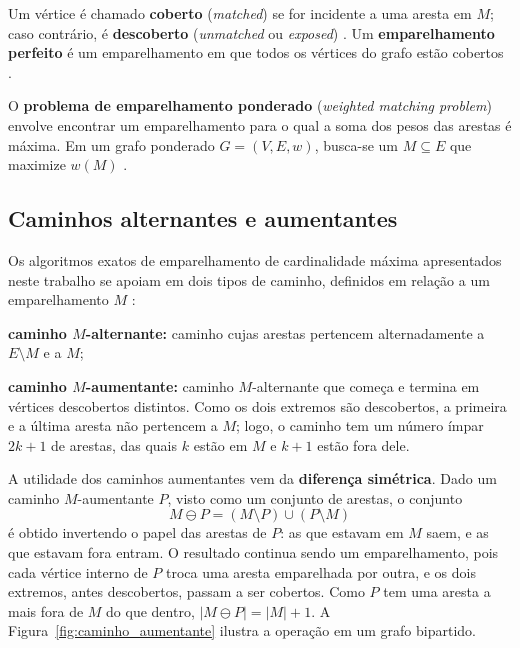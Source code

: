 Um vértice é chamado \textbf{coberto} (\textit{matched}) se for incidente a uma aresta em $M$; caso contrário, é \textbf{descoberto} (\textit{unmatched} ou \textit{exposed}) \cite{cormen}. Um \textbf{emparelhamento perfeito} é um emparelhamento em que todos os vértices do grafo estão cobertos \cite{kleinberg}.

O \textbf{problema de emparelhamento ponderado} (\textit{weighted matching problem}) envolve encontrar um emparelhamento para o qual a soma dos pesos das arestas é máxima. Em um grafo ponderado $G=(V,E,w)$, busca-se um $M\subseteq E$ que maximize $w(M)$ \cite{matching_gpus_sc24}.

\subsection{Caminhos alternantes e aumentantes}
\label{sec:caminhos_alternantes}

Os algoritmos exatos de emparelhamento de cardinalidade máxima apresentados neste trabalho se apoiam em dois tipos de caminho, definidos em relação a um emparelhamento $M$ \cite{schrijver}:

\begin{alineas}
    \item \textbf{caminho $M$-alternante:} caminho cujas arestas pertencem alternadamente a $E \setminus M$ e a $M$;
    \item \textbf{caminho $M$-aumentante:} caminho $M$-alternante que começa e termina em vértices descobertos distintos. Como os dois extremos são descobertos, a primeira e a última aresta não pertencem a $M$; logo, o caminho tem um número ímpar $2k+1$ de arestas, das quais $k$ estão em $M$ e $k+1$ estão fora dele.
\end{alineas}

A utilidade dos caminhos aumentantes vem da \textbf{diferença simétrica}. Dado um caminho $M$-aumentante $P$, visto como um conjunto de arestas, o conjunto
\begin{equation}
    M \ominus P = (M \setminus P) \cup (P \setminus M)
    \label{eq:diferenca_simetrica}
\end{equation}
é obtido invertendo o papel das arestas de $P$: as que estavam em $M$ saem, e as que estavam fora entram. O resultado continua sendo um emparelhamento, pois cada vértice interno de $P$ troca uma aresta emparelhada por outra, e os dois extremos, antes descobertos, passam a ser cobertos. Como $P$ tem uma aresta a mais fora de $M$ do que dentro, $|M \ominus P| = |M| + 1$. A Figura~\ref{fig:caminho_aumentante} ilustra a operação em um grafo bipartido.

